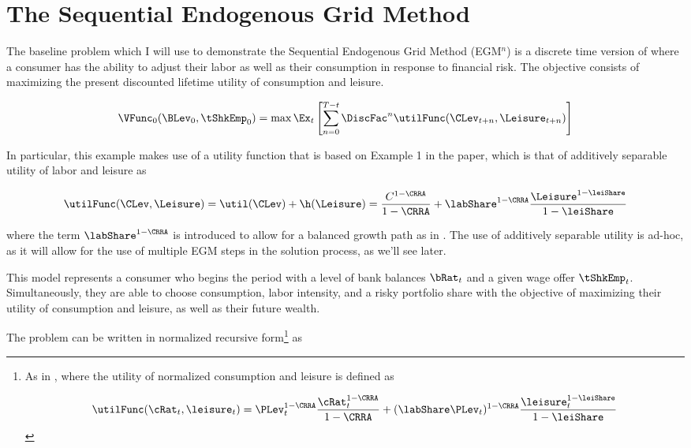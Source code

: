 \documentclass[\econtexRoot/SequentialEGM]{subfiles}
\begin{document}
\hypertarget{method}{}
\par\section{The Sequential Endogenous Grid Method}
\notinsubfile{\label{sec:method}}


The baseline problem which I will use to demonstrate the Sequential Endogenous Grid Method (EGM$^n$) is a discrete time version of \cite{Bodie1992} where a consumer has the ability to adjust their labor as well as their consumption in response to financial risk. The objective consists of maximizing the present discounted lifetime utility of consumption and leisure.

\begin{equation}
  \VFunc_0(\BLev_0, \tShkEmp_0) = \max \Ex_{t} \left[ \sum_{n = 0}^{T-t} \DiscFac^{n} \utilFunc(\CLev_{t+n}, \Leisure_{t+n})  \right]
\end{equation}

In particular, this example makes use of a utility function that is based on Example 1 in the paper, which is that of additively separable utility of labor and leisure as

\begin{equation}
  \utilFunc(\CLev, \Leisure) = \util(\CLev) + \h(\Leisure) = \frac{C^{1-\CRRA}}{1-\CRRA} + \labShare^{1-\CRRA} \frac{\Leisure^{1-\leiShare}}{1-\leiShare}
\end{equation}

where the term $\labShare^{1-\CRRA}$ is introduced to allow for a balanced growth path as in \cite{Mertens2011}. The use of additively separable utility is ad-hoc, as it will allow for the use of multiple EGM steps in the solution process, as we'll see later.

This model represents a consumer who begins the period with a level of bank balances $\bRat_{t}$ and a given wage offer $\tShkEmp_{t}$. Simultaneously, they are able to choose consumption, labor intensity, and a risky portfolio share with the objective of maximizing their utility of consumption and leisure, as well as their future wealth.

The problem can be written in normalized recursive form\footnote{
  As in \cite{Carroll2009}, where the utility of normalized consumption and leisure is defined as

  \begin{equation}
    \utilFunc(\cRat_{t}, \leisure_{t}) = \PLev_{t}^{1-\CRRA} \frac{\cRat_{t}^{1-\CRRA}}{1-\CRRA} + (\labShare\PLev_{t})^{1-\CRRA} \frac{\leisure_{t}^{1-\leiShare}}{1-\leiShare}
  \end{equation}

} as
\end{document}
